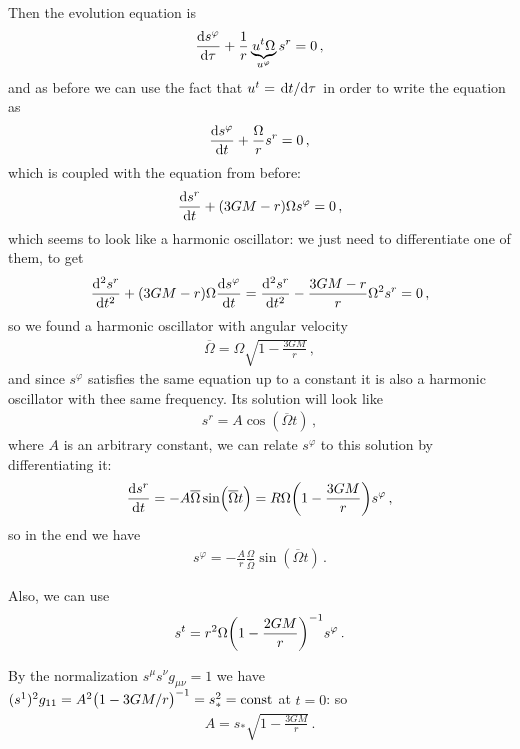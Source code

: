 \documentclass[main.tex]{subfiles}
\begin{document}
Then the evolution equation is 
%
\begin{align}
  \dv{s^{\varphi }}{\tau } + \frac{1}{r} \underbrace{u^{t} \Omega}_{ u^{\varphi }} s^{r} = 0  
\,,
\end{align}
%
and as before we can use the fact that \(u^{t} = \dv*{t}{\tau }\) in order to write the equation as 
%
\begin{align}
  \dv{s^{\varphi }}{t} + \frac{\Omega}{r} s^{r} =0 
\,,
\end{align}
%
which is coupled with the equation from before: 
%
\begin{align}
    \dv{s^{r}}{t} + \qty(3GM - r)\Omega s^{\varphi }= 0
\,,
\end{align}
%
which seems to look like a harmonic oscillator: we just need to differentiate one of them, to get 
%
\begin{align}
  \dv[2]{s^{r}}{t} + (3GM-r) \Omega \dv{s^{\varphi }}{t} = \dv[2]{s^{r}}{t} - \frac{3GM-r}{r} \Omega^2 s^{r} = 0
\,,
\end{align}
%
so we found a harmonic oscillator with angular velocity 
%
\begin{align}
  \overline{\Omega} = \Omega \sqrt{1 - \frac{3GM}{r}}
\,,
\end{align}
%
and since \(s^{\varphi }\) satisfies the same equation up to a constant it is also a harmonic oscillator with thee same frequency. 
Its solution will look like 
%
\begin{align}
s^{r} = A \cos(\overline{\Omega} t)
\,,
\end{align}
%
where \(A\) is an arbitrary constant,
we can relate \(s^{\varphi } \) to this solution by differentiating it:
%
\begin{align}
  \dv{s^{r}}{t} =
  - A  \overline{\Omega} \sin(\overline{\Omega} t) = R \Omega \qty(1 - \frac{3GM}{r}) s^{\varphi }
\,,
\end{align}
%
so in the end we have 
%
\begin{align}
  s^{\varphi } = - \frac{A}{r} \frac{\Omega}{\overline{\Omega}} \sin(\overline{\Omega} t)
\,.
\end{align}

Also, we can use 
%
\begin{align}
  s^{t} = r^2 \Omega \qty(1 - \frac{2GM}{r})^{-1} s^{\varphi }
\,.
\end{align}

By the normalization \(s^{\mu } s^{\nu } g_{\mu \nu } = 1\) we have \((s^{1})^2 g_{11} = A^2 \qty(1 - 3GM/r)^{-1}=s_{*}^2 = \text{const}\) at \(t=0\): so 
%
\begin{align}
  A = s_{*} \sqrt{1 - \frac{3GM}{r}}
\,.
\end{align}
\end{document}
